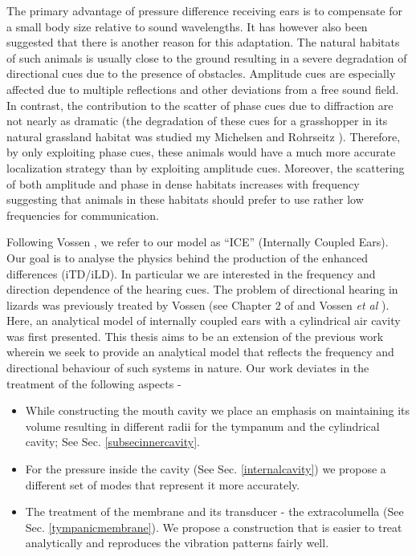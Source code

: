 The primary advantage of pressure difference receiving ears is to compensate for a small body size relative to sound wavelengths. It has
however also been suggested that there is another reason for this adaptation. The natural habitats of such animals
is usually close to the ground resulting in a severe degradation of directional cues due to the presence of obstacles. Amplitude cues are especially affected due to multiple reflections and other deviations
from a free sound field. In contrast, the contribution to the scatter of phase cues due to diffraction are not nearly as dramatic (the degradation
of these cues for a grasshopper in its natural grassland habitat was studied my Michelsen and Rohrseitz \cite{michelsenrohrseitz97}). Therefore,
 by only exploiting phase cues, these animals would have a much more accurate localization strategy than by exploiting amplitude cues. Moreover, 
 the scattering of both amplitude and phase in dense habitats increases with frequency suggesting that animals in these habitats should prefer to
 use rather low frequencies for communication. 

Following Vossen \cite{vossenjasa},  we refer to our model as ``ICE'' (Internally Coupled Ears). Our goal is to analyse the physics behind the production of the
enhanced differences (iTD/iLD). In particular we are interested in the frequency and direction dependence of the hearing cues. The problem of
directional hearing in lizards was previously treated by Vossen (see Chapter 2 of \cite{vossenthesis} and Vossen \emph{et al} \cite{vossenjasa}).
Here, an analytical model of internally coupled ears with a cylindrical air cavity was first presented. This thesis aims to be an extension of the previous work
wherein we seek to provide an analytical model that reflects the frequency and directional behaviour of such systems in nature. Our work deviates in
the treatment of the following aspects - 
\begin{itemize}
 \item While constructing the mouth cavity we place an emphasis on maintaining its volume resulting in different radii for the tympanum and the cylindrical cavity; See Sec. \ref{subsecinnercavity}.
 \item For the pressure inside the cavity (See Sec. \ref{internalcavity}) we propose a different set of modes that represent it more accurately.
 \item The treatment of the membrane and its transducer - the extracolumella (See Sec. \ref{tympanicmembrane}). We propose a construction that is easier to treat analytically and reproduces
 the vibration patterns fairly well.
 \end{itemize}

